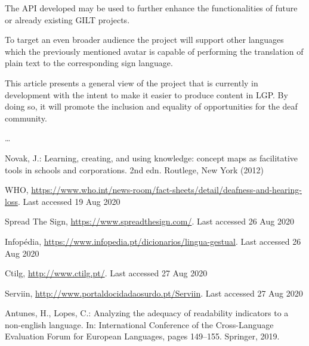 \documentclass[runningheads]{llncs}
\begin{document}
The API developed may be used to further enhance the functionalities of future or already existing GILT projects.

To target an even broader audience the project will support other languages which the previously mentioned avatar is capable of performing the translation of plain text to the corresponding sign language.

This article presents a general view of the project that is currently in development with the intent to make it easier to produce content in LGP.
By doing so, it will promote the inclusion and equality of opportunities for the deaf community.

\dots

%
%
%
% 
% 
%
\begin{thebibliography}{8}
        Novak, J.: Learning, creating, and using knowledge: concept maps as facilitative tools in schools and corporations. 2nd edn. Routlege, New York (2012)

        WHO, \url{https://www.who.int/news-room/fact-sheets/detail/deafness-and-hearing-loss}. Last accessed 19 Aug 2020

        Spread The Sign, \url{https://www.spreadthesign.com/}. Last accessed 26 Aug 2020

        Infopédia, \url{https://www.infopedia.pt/dicionarios/lingua-gestual}. Last accessed 26 Aug 2020

        Ctilg, \url{http://www.ctilg.pt/}. Last accessed 27 Aug 2020

        Serviin, \url{http://www.portaldocidadaosurdo.pt/Serviin}. Last accessed 27 Aug 2020

        Antunes, H., Lopes, C.: Analyzing the adequacy of readability indicators to a non-english language.
        In: International Conference of the Cross-Language Evaluation Forum for European Languages,
        pages 149--155. Springer, 2019.





\end{thebibliography}
\end{document}
